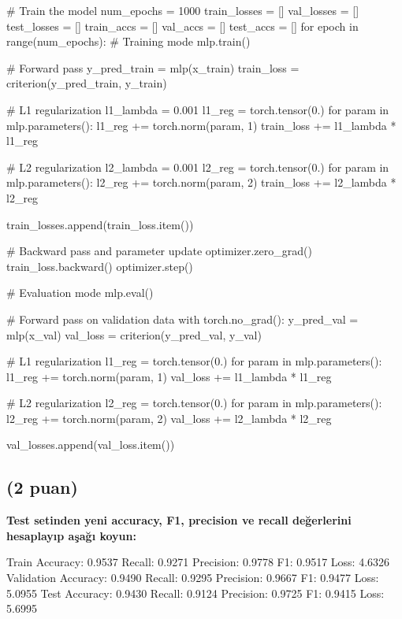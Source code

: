 \documentclass[11pt]{article}
\begin{document}
\begin{python}
# Train the model
num_epochs = 1000
train_losses = []
val_losses = []
test_losses = []
train_accs = []
val_accs = []
test_accs = []
for epoch in range(num_epochs):
    # Training mode
    mlp.train()
    
    # Forward pass
    y_pred_train = mlp(x_train)
    train_loss = criterion(y_pred_train, y_train)
    
    # L1 regularization
    l1_lambda = 0.001
    l1_reg = torch.tensor(0.)
    for param in mlp.parameters():
        l1_reg += torch.norm(param, 1)
    train_loss += l1_lambda * l1_reg
    
    # L2 regularization
    l2_lambda = 0.001
    l2_reg = torch.tensor(0.)
    for param in mlp.parameters():
        l2_reg += torch.norm(param, 2)
    train_loss += l2_lambda * l2_reg
    
    train_losses.append(train_loss.item())

    # Backward pass and parameter update
    optimizer.zero_grad()
    train_loss.backward()
    optimizer.step()

    # Evaluation mode
    mlp.eval()

    # Forward pass on validation data
    with torch.no_grad():
        y_pred_val = mlp(x_val)
        val_loss = criterion(y_pred_val, y_val)
        
        # L1 regularization
        l1_reg = torch.tensor(0.)
        for param in mlp.parameters():
            l1_reg += torch.norm(param, 1)
        val_loss += l1_lambda * l1_reg

        # L2 regularization
        l2_reg = torch.tensor(0.)
        for param in mlp.parameters():
            l2_reg += torch.norm(param, 2)
        val_loss += l2_lambda * l2_reg
        
        val_losses.append(val_loss.item())
\end{python}

\subsection{(2 puan)} \textbf{Test setinden yeni accuracy, F1, precision ve recall değerlerini hesaplayıp aşağı koyun:}

Train Accuracy: 0.9537 Recall: 0.9271 Precision: 0.9778 F1: 0.9517 Loss: 4.6326
Validation Accuracy: 0.9490 Recall: 0.9295 Precision: 0.9667 F1: 0.9477 Loss: 5.0955
Test Accuracy: 0.9430 Recall: 0.9124 Precision: 0.9725 F1: 0.9415 Loss: 5.6995
\end{document}
